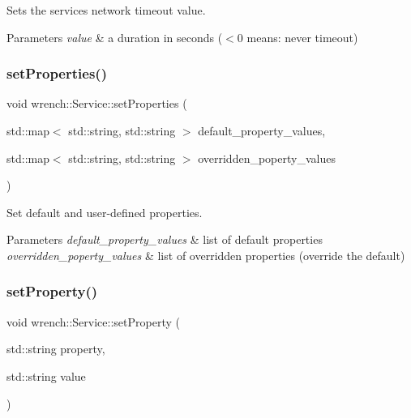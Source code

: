 Sets the service\textquotesingle{}s network timeout value. 


\begin{DoxyParams}{Parameters}
{\em value} & a duration in seconds ($<$0 means\+: never timeout) \\
\hline
\end{DoxyParams}
\mbox{\label{classwrench_1_1_service_ac42e376453c0f471b4826dd732fc14c5}} 
\subsubsection{\texorpdfstring{set\+Properties()}{setProperties()}}
{\footnotesize\ttfamily void wrench\+::\+Service\+::set\+Properties (\begin{DoxyParamCaption}\item[{std\+::map$<$ std\+::string, std\+::string $>$}]{default\+\_\+property\+\_\+values,  }\item[{std\+::map$<$ std\+::string, std\+::string $>$}]{overridden\+\_\+poperty\+\_\+values }\end{DoxyParamCaption})\hspace{0.3cm}{\ttfamily [protected]}}



Set default and user-\/defined properties. 


\begin{DoxyParams}{Parameters}
{\em default\+\_\+property\+\_\+values} & list of default properties \\
\hline
{\em overridden\+\_\+poperty\+\_\+values} & list of overridden properties (override the default) \\
\hline
\end{DoxyParams}
\mbox{\label{classwrench_1_1_service_a0b05fdef3ddb499a537d55f046a396d7}} 
\subsubsection{\texorpdfstring{set\+Property()}{setProperty()}}
{\footnotesize\ttfamily void wrench\+::\+Service\+::set\+Property (\begin{DoxyParamCaption}\item[{std\+::string}]{property,  }\item[{std\+::string}]{value }\end{DoxyParamCaption})\hspace{0.3cm}{\ttfamily [protected]}}



